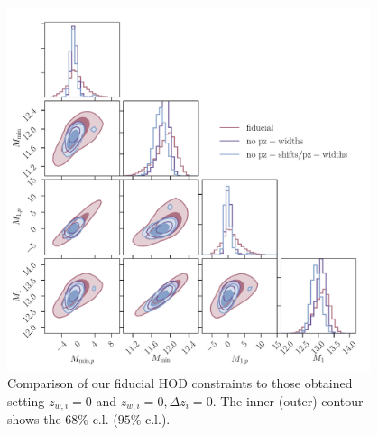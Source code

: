\documentclass[a4paper,11pt]{article}
\begin{document}
 \begin{figure}
\begin{center}
\includegraphics[width=0.95\textwidth]{figures/contours-Mmin-M1_mPk=HOD_fix=alpha-fc-sigmaM_HOD=zevol_fit=pz-shifts-pz-widths+prior=0p2_fit=auto+cross_cosmo=const_cov=G+NG+SSC-LINBIAS_HOD-param=zfid_clfit=HOD-zevol_fit=pz-shifts+widths-vs-fit=pz-shifts-vs-no-pz-shifts.pdf}
\caption{Comparison of our fiducial HOD constraints to those obtained setting $z_{w, i} = 0$ and $z_{w, i} = 0, \Delta z_{i} = 0$. The inner (outer) contour shows the $68 \%$ c.l. ($95 \%$ c.l.).}
\label{fig:constraints-hod-pz-shifts-pz-widths-vs-pz-shifts-vs-no-pz-shifts}
\end{center}
\end{figure}
\end{document}
